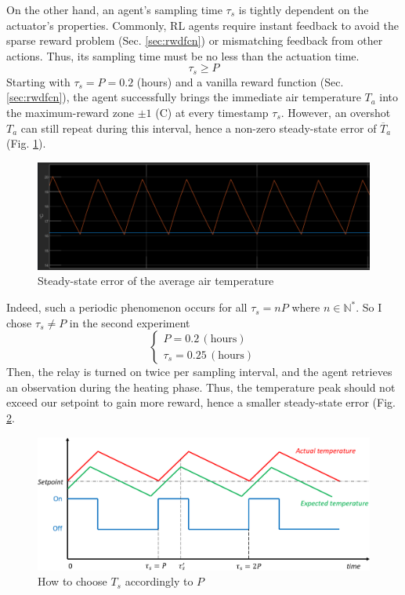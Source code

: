\documentclass[../main.tex]{subfiles}
\begin{document}
On the other hand, an agent's sampling time $\tau_s$ is tightly dependent on the actuator's properties. Commonly, RL agents require instant feedback to avoid the sparse reward problem (Sec. \ref{sec:rwdfcn}) or mismatching feedback from other actions. Thus, its sampling time must be no less than the actuation time.
    $$\tau_s \geq P$$
Starting with $\tau_s = P = 0.2$ (hours) and a vanilla reward function (Sec. \ref{sec:rwdfcn}), the agent successfully brings the immediate air temperature $T_a$ into the maximum-reward zone $\pm 1$ (\degree C) at every timestamp $\tau_s$. However, an overshot $T_a$ can still repeat during this interval, hence a non-zero steady-state error of $\overline{T}_a$ (Fig. \ref{fig:sse}).
\begin{figure}[htbp]
    \centering
    \includegraphics[width=1\linewidth]{figures/false_positive_policy_result.png}
    \caption{Steady-state error of the average air temperature}
    \label{fig:sse}
\end{figure}
Indeed, such a periodic phenomenon occurs for all $\tau_s = nP$ where $n \in \mathbb{N}^*$. So I chose $\tau_s \neq P$ in the second experiment
\begin{equation}
    \begin{cases}
        P = 0.2 \,(\text{hours}) \\
        \tau_s = 0.25 \,(\text{hours})
    \end{cases}
\end{equation}
Then, the relay is turned on twice per sampling interval, and the agent retrieves an observation during the heating phase. Thus, the temperature peak should not exceed our setpoint to gain more reward, hence a smaller steady-state error (Fig. \ref{fig:choose_p_ts}.
\begin{figure}[htbp]
    \centering
    \includegraphics[width=1\linewidth]{figures/choosing_P_Ts.png}
    \caption{How to choose $T_s$ accordingly to $P$}
    \label{fig:choose_p_ts}
\end{figure}
\end{document}
